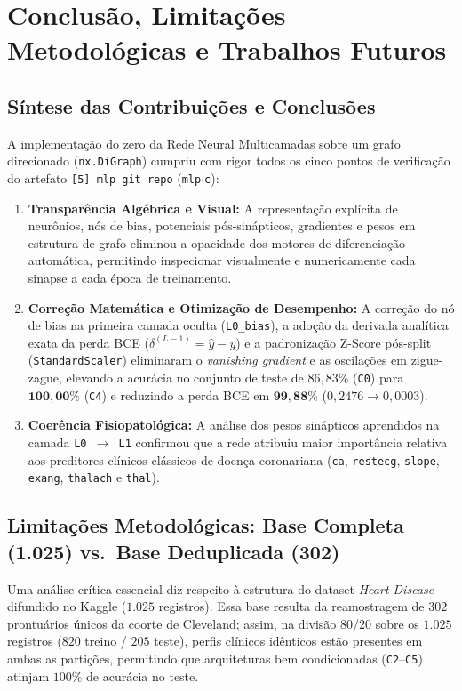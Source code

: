 \section{Conclusão, Limitações Metodológicas e Trabalhos Futuros}
\label{sec:conclusao}

\subsection{Síntese das Contribuições e Conclusões}
A implementação do zero da Rede Neural Multicamadas sobre um grafo direcionado (\texttt{nx.DiGraph}) cumpriu com rigor todos os cinco pontos de verificação do artefato \texttt{[5] mlp git repo} (\texttt{mlp$\cdot$c}):
\begin{enumerate}
    \item \textbf{Transparência Algébrica e Visual:} A representação explícita de neurônios, nós de bias, potenciais pós-sinápticos, gradientes e pesos em estrutura de grafo eliminou a opacidade dos motores de diferenciação automática, permitindo inspecionar visualmente e numericamente cada sinapse a cada época de treinamento.
    \item \textbf{Correção Matemática e Otimização de Desempenho:} A correção do nó de bias na primeira camada oculta (\texttt{L0\_bias}), a adoção da derivada analítica exata da perda BCE ($\delta^{(L-1)} = \hat{y} - y$) e a padronização Z-Score pós-split (\texttt{StandardScaler}) eliminaram o \textit{vanishing gradient} e as oscilações em zigue-zague, elevando a acurácia no conjunto de teste de $86{,}83\%$ (\texttt{C0}) para $\mathbf{100{,}00\%}$ (\texttt{C4}) e reduzindo a perda BCE em $\mathbf{99{,}88\%}$ ($0{,}2476 \to 0{,}0003$).
    \item \textbf{Coerência Fisiopatológica:} A análise dos pesos sinápticos aprendidos na camada \texttt{L0 $\to$ L1} confirmou que a rede atribuiu maior importância relativa aos preditores clínicos clássicos de doença coronariana (\texttt{ca}, \texttt{restecg}, \texttt{slope}, \texttt{exang}, \texttt{thalach} e \texttt{thal}).
\end{enumerate}

\subsection{Limitações Metodológicas: Base Completa (1.025) vs.\ Base Deduplicada (302)}
Uma análise crítica essencial diz respeito à estrutura do dataset \textit{Heart Disease} difundido no Kaggle ($1.025$ registros). Essa base resulta da reamostragem de $302$ prontuários únicos da coorte de Cleveland; assim, na divisão 80/20 sobre os $1.025$ registros ($820$ treino / $205$ teste), perfis clínicos idênticos estão presentes em ambas as partições, permitindo que arquiteturas bem condicionadas (\texttt{C2}--\texttt{C5}) atinjam $100\%$ de acurácia no teste.


